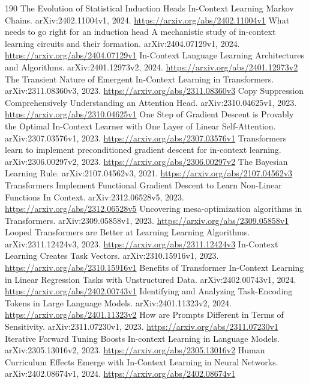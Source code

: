 \documentclass[11pt]{article}
\begin{document}
\begin{thebibliography}{190}
 The Evolution of Statistical Induction Heads In-Context Learning Markov Chains. arXiv:2402.11004v1, 2024. \url{https://arxiv.org/abs/2402.11004v1}
 What needs to go right for an induction head A mechanistic study of in-context learning circuits and their formation. arXiv:2404.07129v1, 2024. \url{https://arxiv.org/abs/2404.07129v1}
 In-Context Language Learning Architectures and Algorithms. arXiv:2401.12973v2, 2024. \url{https://arxiv.org/abs/2401.12973v2}
 The Transient Nature of Emergent In-Context Learning in Transformers. arXiv:2311.08360v3, 2023. \url{https://arxiv.org/abs/2311.08360v3}
 Copy Suppression Comprehensively Understanding an Attention Head. arXiv:2310.04625v1, 2023. \url{https://arxiv.org/abs/2310.04625v1}
 One Step of Gradient Descent is Provably the Optimal In-Context Learner with One Layer of Linear Self-Attention. arXiv:2307.03576v1, 2023. \url{https://arxiv.org/abs/2307.03576v1}
 Transformers learn to implement preconditioned gradient descent for in-context learning. arXiv:2306.00297v2, 2023. \url{https://arxiv.org/abs/2306.00297v2}
 The Bayesian Learning Rule. arXiv:2107.04562v3, 2021. \url{https://arxiv.org/abs/2107.04562v3}
 Transformers Implement Functional Gradient Descent to Learn Non-Linear Functions In Context. arXiv:2312.06528v5, 2023. \url{https://arxiv.org/abs/2312.06528v5}
 Uncovering mesa-optimization algorithms in Transformers. arXiv:2309.05858v1, 2023. \url{https://arxiv.org/abs/2309.05858v1}
 Looped Transformers are Better at Learning Learning Algorithms. arXiv:2311.12424v3, 2023. \url{https://arxiv.org/abs/2311.12424v3}
 In-Context Learning Creates Task Vectors. arXiv:2310.15916v1, 2023. \url{https://arxiv.org/abs/2310.15916v1}
 Benefits of Transformer In-Context Learning in Linear Regression Tasks with Unstructured Data. arXiv:2402.00743v1, 2024. \url{https://arxiv.org/abs/2402.00743v1}
 Identifying and Analyzing Task-Encoding Tokens in Large Language Models. arXiv:2401.11323v2, 2024. \url{https://arxiv.org/abs/2401.11323v2}
 How are Prompts Different in Terms of Sensitivity. arXiv:2311.07230v1, 2023. \url{https://arxiv.org/abs/2311.07230v1}
 Iterative Forward Tuning Boosts In-context Learning in Language Models. arXiv:2305.13016v2, 2023. \url{https://arxiv.org/abs/2305.13016v2}
 Human Curriculum Effects Emerge with In-Context Learning in Neural Networks. arXiv:2402.08674v1, 2024. \url{https://arxiv.org/abs/2402.08674v1}

\end{thebibliography}
\end{document}

